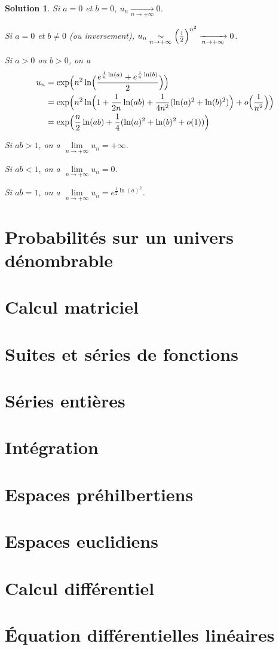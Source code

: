 \documentclass[12pt]{article}
\newtheorem{solution}{Solution}[section]
\theoremstyle{remark}
\numberwithin{equation}{section}
\begin{document}
\begin{solution}
	Si $a=0$ et $b=0$, $u_{n}\xrightarrow[n\to+\infty]{}0$.

	Si $a=0$ et $b\neq0$ (ou inversement), $u_{n}\underset{n\to+\infty}{\sim}\Bigl(\frac{1}{2}\Bigr)^{n^{2}}\xrightarrow[n\to+\infty]{}0$.

	Si $a>0$ ou $b>0$, on a
	\begin{align*}
		u_{n}
		&=\exp\Bigl(n^{2}\ln\Bigl(\frac{e^{\frac{1}{n}\ln(a)}+e^{\frac{1}{n}\ln(b)}}{2}\Bigr)\Bigr)\\
		&=\exp\Bigl(n^{2}\ln\Bigl(1+\frac{1}{2n}\ln(ab)+\frac{1}{4n^2}(\ln(a)^{2}+\ln(b)^{2})\Bigr)+o\Bigl(\frac{1}{n^{2}}\Bigr)\Bigr)\\
		&=\exp\Bigl(\frac{n}{2}\ln(ab)+\frac{1}{4}(\ln(a)^{2}+\ln(b)^{2}+o(1))\Bigr)
	\end{align*}

	Si $ab>1$, on a $\lim\limits_{n\to+\infty} u_{n}=+\infty$.
	
	Si $ab<1$, on a $\lim\limits_{n\to+\infty} u_{n}=0$.

	Si $ab=1$, on a $\lim\limits_{n\to+\infty} u_{n}=e^{\frac{1}{2}\ln(a)^{2}}$.
\end{solution}

\section{Probabilités sur un univers dénombrable}
\section{Calcul matriciel}




\section{Suites et séries de fonctions}
\section{Séries entières}
\section{Intégration}
\section{Espaces préhilbertiens}
\section{Espaces euclidiens}
\section{Calcul différentiel}
\section{\'Equation différentielles linéaires}
\end{document}
